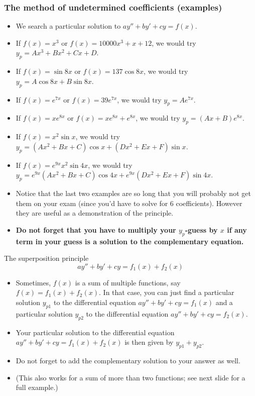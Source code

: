 \begin{frame}
\frametitle{The method of undetermined coefficients (examples)}{\footnotesize
\begin{itemize}
    \item We search a particular solution to $ay''+by'+cy=f(x)$.
    \item If $f(x)=x^3$ or $f(x)=10000x^3+x+12$, we would try $y_p=Ax^3+Bx^2+Cx+D$.
    \item If $f(x)=\sin 8x$ or $f(x)=137\cos 8x$, we would try $y_p=A\cos 8x + B\sin 8x$.
    \item If $f(x)=e^{7x}$ or $f(x)=39e^{7x}$, we would try $y_p=Ae^{7x}$.
    \item If $f(x)=xe^{8x}$ or $f(x)=xe^{8x}+e^{8x}$, we would try $y_p=(Ax+B)e^{8x}$.
    \item If $f(x)=x^2\sin {x}$, we would try $y_p=(Ax^2+Bx+C)\cos x + (Dx^2+Ex+F)\sin x$.
    \item If $f(x)=e^{9x}x^2\sin 4x$, we would try $y_p=e^{9x}(Ax^2+Bx+C)\cos 4x + e^{9x}(Dx^2+Ex+F)\sin 4x$.
    \item Notice that the last two examples are so long that you will probably not get them on your exam (since you'd have to solve for 6 coefficients). However they are useful as a demonstration of the principle.
    \item \textbf{Do not forget that you have to multiply your $y_p$-guess by $x$ if any term in your guess is a solution to the complementary equation.}
    
\end{itemize}}
\end{frame}

\begin{frame}{The superposition principle}
\[ay''+by'+cy=f_1(x)+f_2(x)\]
\begin{itemize}
    \item Sometimes, $f(x)$ is a sum of multiple functions, say $f(x)=f_1(x)+f_2(x)$. In that case, you can just find a particular solution $y_{p1}$ to the differential equation $ay''+by'+cy=f_1(x)$ and a particular solution $y_{p2}$ to the differential equation $ay''+by'+cy=f_2(x)$.

    \item Your particular solution to the differential equation $ay''+by'+cy=f_1(x)+f_2(x)$ is then given by $y_{p1}+y_{p2}$.
    \item Do not forget to add the complementary solution to your answer as well.

    \item (This also works for a sum of more than two functions; see next slide for a full example.)
    \end{itemize}
\end{frame}

